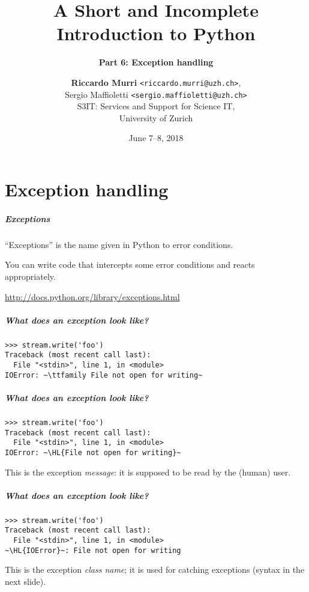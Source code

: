 \documentclass[english,serif,mathserif,xcolor=pdftex,dvipsnames,table]{beamer}
\title[6. Exception handling]{%
  A Short and Incomplete Introduction to Python
}
\subtitle{\bfseries Part 6: Exception handling}
\author[R.~Murri]{%
  \textbf{Riccardo Murri} \texttt{<riccardo.murri@uzh.ch>}, \\
  Sergio Maffioletti \texttt{<sergio.maffioletti@uzh.ch>}
  \\
  S3IT: Services and Support for Science IT,
  \\
  University of Zurich
}
\date{June 7--8, 2018}
\begin{document}
\maketitle


\part{Exception handling}

\begin{frame}[fragile]
  \frametitle{Exceptions}

  ``Exceptions'' is the name given in Python to error conditions.

  \+
  You can write code that intercepts some error conditions and
  reacts appropriately.

  \+
  \begin{seealso}
    \url{http://docs.python.org/library/exceptions.html}
  \end{seealso}
\end{frame}


\begin{frame}[fragile]
  \frametitle{What does an exception look like?}
\begin{lstlisting}
>>> stream.write('foo')
Traceback (most recent call last):
  File "<stdin>", line 1, in <module>
IOError: ~\ttfamily File not open for writing~
\end{lstlisting}
\end{frame}


\begin{frame}[fragile]
  \frametitle{What does an exception look like?}
\begin{lstlisting}
>>> stream.write('foo')
Traceback (most recent call last):
  File "<stdin>", line 1, in <module>
IOError: ~\HL{File not open for writing}~
\end{lstlisting}

  \+
  This is the exception \emph{message}: it is supposed to be read
  by the (human) user.
\end{frame}


\begin{frame}[fragile]
  \frametitle{What does an exception look like?}
\begin{lstlisting}
>>> stream.write('foo')
Traceback (most recent call last):
  File "<stdin>", line 1, in <module>
~\HL{IOError}~: File not open for writing
\end{lstlisting}

  \+ This is the exception \emph{class name}; it is used for catching
  exceptions (syntax in the next slide).
\end{frame}
\end{document}
